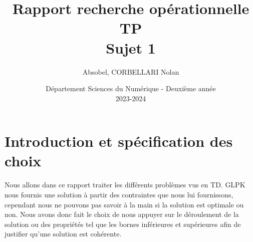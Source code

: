 \documentclass[12pt]{article}
\begin{document}
\title{\vspace{4cm} \textbf{Rapport recherche opérationnelle TP \\ Sujet 1}}
\author{Absobel, CORBELLARI Nolan}
\date{\vspace{7cm} Département Sciences du Numérique - Deuxième année \\
2023-2024}

\maketitle

\newpage
\pagebreak
\vfill

\newpage
\tableofcontents
\newpage

\section{Introduction et spécification des choix}
Nous allons dans ce rapport traiter les différents problèmes vus en TD. GLPK nous fournis une solution à partir des contraintes que nous lui fournissons,
cependant nous ne pouvons pas savoir à la main si la solution est optimale ou non.
Nous avons donc fait le choix de nous appuyer sur le déroulement de la solution ou des propriétés tel que les bornes inférieures et supérieures afin de justifier qu'une solution est cohérente.

 \newpage
 \newpage
 \newpage
 \newpage
\end{document}
